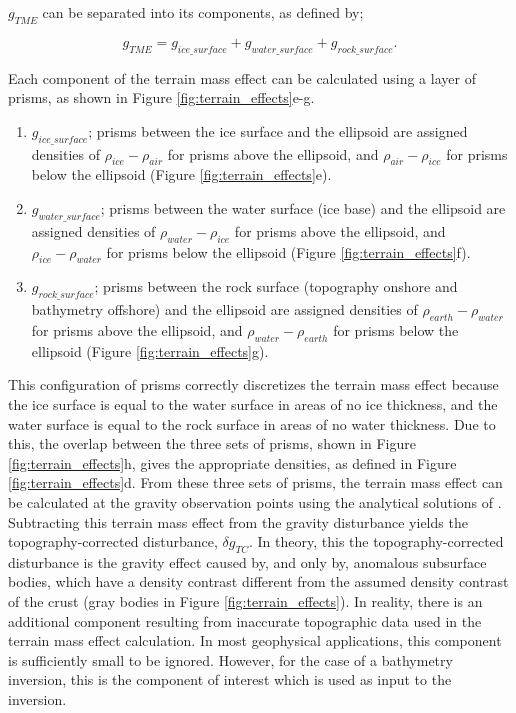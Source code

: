 \documentclass[tc, manuscript]{copernicus}
\begin{document}
$g_{TME}$ can be separated into its components, as defined by;

\begin{equation} \label{eq:terrain_mass_effect}
    g_{TME} = g_{ice{\_}surface} + g_{water{\_}surface} + g_{rock{\_}surface}.
\end{equation}

Each component of the terrain mass effect can be calculated using a layer of prisms, as shown in Figure \ref{fig:terrain_effects}e-g.

\begin{enumerate}
    \item $g_{ice{\_}surface}$; prisms between the ice surface and the ellipsoid are assigned densities of $\rho_{ice} - \rho_{air}$ for prisms above the ellipsoid, and $\rho_{air} - \rho_{ice}$ for prisms below the ellipsoid (Figure \ref{fig:terrain_effects}e).
    \item $g_{water{\_}surface}$; prisms between the water surface (ice base) and the ellipsoid are assigned densities of $\rho_{water} - \rho_{ice}$ for prisms above the ellipsoid, and $\rho_{ice} - \rho_{water}$ for prisms below the ellipsoid (Figure \ref{fig:terrain_effects}f).
    \item $g_{rock{\_}surface}$; prisms between the rock surface (topography onshore and bathymetry offshore) and the ellipsoid are assigned densities of $\rho_{earth} - \rho_{water}$ for prisms above the ellipsoid, and $\rho_{water} - \rho_{earth}$ for prisms below the ellipsoid (Figure \ref{fig:terrain_effects}g).
\end{enumerate}

This configuration of prisms correctly discretizes the terrain mass effect because the ice surface is equal to the water surface in areas of no ice thickness, and the water surface is equal to the rock surface in areas of no water thickness. Due to this, the overlap between the three sets of prisms, shown in Figure \ref{fig:terrain_effects}h, gives the appropriate densities, as defined in Figure \ref{fig:terrain_effects}d. From these three sets of prisms, the terrain mass effect can be calculated at the gravity observation points using the analytical solutions of \citet{nagygravitational2000}.\\

Subtracting this terrain mass effect from the gravity disturbance yields the topography-corrected disturbance, $\delta g_{TC}$. In theory, this the topography-corrected disturbance is the gravity effect caused by, and only by, anomalous subsurface bodies, which have a density contrast different from the assumed density contrast of the crust (gray bodies in Figure \ref{fig:terrain_effects}). In reality, there is an additional component resulting from inaccurate topographic data used in the terrain mass effect calculation. In most geophysical applications, this component is sufficiently small to be ignored. However, for the case of a bathymetry inversion, this is the component of interest which is used as input to the inversion.
\end{document}
